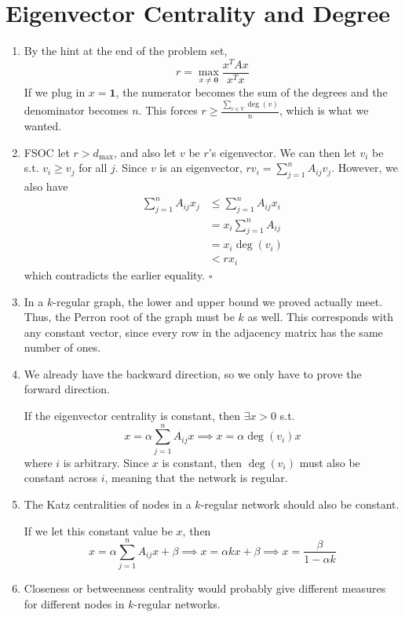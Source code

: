 \documentclass[12pt]{article}
\begin{document}
\pagebreak

\section{Eigenvector Centrality and Degree}

\begin{enumerate}
      \item By the hint at the end of the problem set,
            \[r = \max_{x \ne \mathbf{0}} \frac{x^TAx}{x^Tx}\]
            If we plug in $x=\mathbf{1}$, the numerator becomes the sum of the degrees
            and the denominator becomes $n$.
            This forces $r \ge \frac{\sum_{v \in V} \deg(v)}{n}$, which is what we wanted.

      \item FSOC let $r > d_\text{max}$, and also let $v$ be $r$'s eigenvector.
            We can then let $v_i$ be s.t. $v_i \ge v_j$ for all $j$.
            Since $v$ is an eigenvector, $rv_i=\sum_{j=1}^{n} A_{ij}v_j$.
            However, we also have
            \begin{align*}
                  \sum_{j=1}^{n} A_{ij}x_j
                   & \le \sum_{j=1}^{n} A_{ij}x_i \\
                   & = x_i \sum_{j=1}^{n} A_{ij}  \\
                   & = x_i \deg(v_i)              \\
                   & < r x_i
            \end{align*}
            which contradicts the earlier equality. $\square$

      \item In a $k$-regular graph, the lower and upper bound we proved actually meet.
            Thus, the Perron root of the graph must be $k$ as well.
            This corresponds with any constant vector, since every row in the
            adjacency matrix has the same number of ones.

      \item We already have the backward direction, so we only have to prove the forward direction.

            If the eigenvector centrality is constant, then $\exists x > 0$ s.t.
            \[x=\alpha\sum_{j=1}^{n} A_{ij}x \implies x=\alpha \deg(v_i)x\]
            where $i$ is arbitrary.
            Since $x$ is constant, then $\deg(v_i)$ must also be constant across $i$,
            meaning that the network is regular.

      \item The Katz centralities of nodes in a $k$-regular network should also be constant.

            If we let this constant value be $x$, then
            \[x=\alpha\sum_{j=1}^{n} A_{ij}x+\beta
                  \implies x = \alpha k x+\beta
                  \implies x=\boxed{\frac{\beta}{1-\alpha k}}\]

      \item Closeness or betweenness centrality would probably give
            different measures for different nodes in $k$-regular networks.
\end{enumerate}
\end{document}
